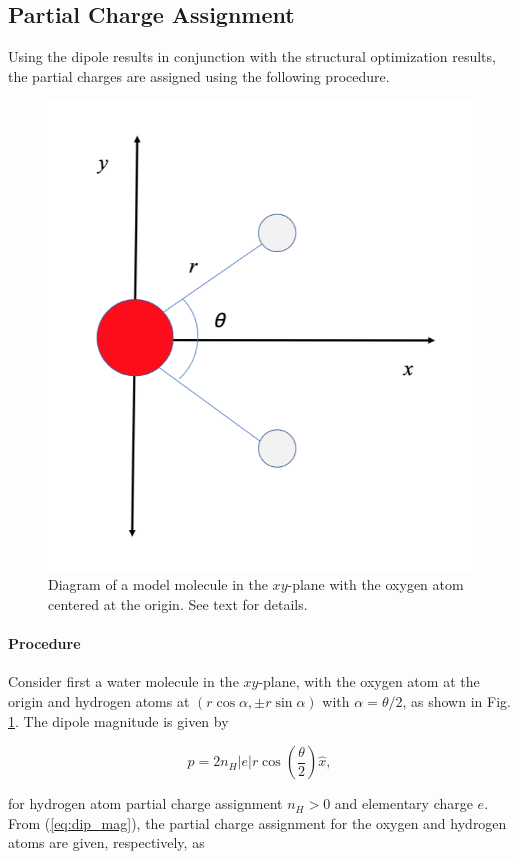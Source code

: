             \subsection{Partial Charge Assignment}
            \label{sec:pc_assign}
            
            Using the dipole results in conjunction with the structural optimization results, the partial charges are assigned using the following procedure.
            
            \begin{figure}
                \centering
                \includegraphics[width=0.5\linewidth]{Figures/System/pc_analysis.png}
                \caption{Diagram of a model molecule in the $xy$-plane with the oxygen atom centered at the origin. See text for details.}
                \label{fig:pc_analysis}
            \end{figure}
            
            \paragraph{Procedure} Consider first a water molecule in the $xy$-plane, with the oxygen atom at the origin and hydrogen atoms at $(r\cos\alpha,\pm r\sin\alpha)$ with $\alpha = \theta/2$, as shown in Fig. \ref{fig:pc_analysis}. The dipole magnitude is given by
            
            \begin{equation}
            \label{eq:dip_mag}
                p = 2n_H|e| r \cos\left(\frac{\theta}{2} \right)\hat{x},
            \end{equation}

        \noindent for hydrogen atom partial charge assignment $n_H > 0$ and elementary charge $e$. From (\ref{eq:dip_mag}), the partial charge assignment for the oxygen and hydrogen atoms are given, respectively, as
        
